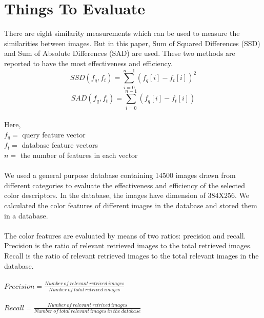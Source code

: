 \documentclass{report}
\begin{document}
\section{Things To Evaluate}
There are eight similarity measurements which can be used to measure the similarities between images. But in this paper, Sum of Squared Differences (SSD) and Sum of Absolute Differences (SAD) are used. These two methods are reported to have the most effectiveness and efficiency. 
\\
\begin{equation}
SSD(f_q,f_t)=\sum_{i=0}^{n-1}(f_q[i]-f_t[i])^2\label{eq:8}
\end{equation}
\begin{equation}
SAD(f_q,f_t)=\sum_{i=0}^{n-1}(f_q[i]-f_t[i])\label{eq:9}
\end{equation}
\\
Here,\\
$f_{q}=$ query feature vector\\
$f_{t}=$ database feature vectors\\
$n=$ the number of features in each vector\\
\\
We used a general purpose database containing 14500 images drawn from different categories to evaluate the effectiveness and efficiency of the selected color descriptors. In the database, the images have dimension of 384X256. We calculated the color features of different images in the database and stored them in a database.\\
\\
The color features are evaluated by means of two ratios: precision and recall. Precision is the ratio of relevant retrieved images to the total retrieved images. Recall is the ratio of relevant retrieved images to the total relevant images in the database.\\
\\
\large
$Precision=\frac{Number \: of\: relevant\: retrived\: images}{Number \: of\: total\: retrived\: images}$\\
\\
$Recall=\frac{Number \: of\: relevant\: retrived\: images}{Number \: of\: total\: relevant\: images \: in \: the\: database}$
\normalfont
\end{document}
